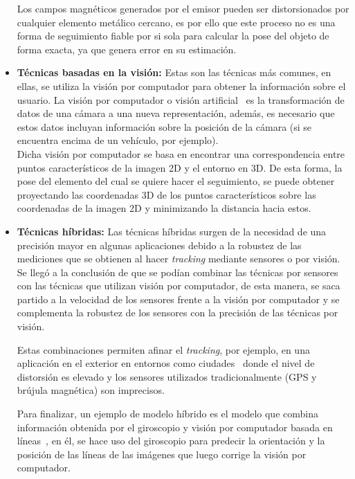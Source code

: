 \begin{itemize}
    Los campos magnéticos generados por el emisor pueden ser distorsionados por cualquier elemento metálico cercano, es por ello que este proceso no es una forma de seguimiento fiable por si sola para calcular la pose del objeto de forma exacta, ya que genera error en su estimación.\\
    

    \item \textbf{Técnicas basadas en la visión:} Estas son las técnicas más comunes, en ellas, se utiliza la visión por computador para obtener la información sobre el usuario. La visión por computador o visión artificial~\cite{visionporcomputador} es la transformación de datos de una cámara a una nueva representación, además, es necesario que estos datos incluyan información sobre la posición de la cámara (si se encuentra encima de un vehículo, por ejemplo).\\
    
    Dicha visión por computador se basa en encontrar una correspondencia entre puntos característicos de la imagen 2D y el entorno en 3D. De esta forma, la pose del elemento del cual se quiere hacer el seguimiento, se puede obtener proyectando las coordenadas 3D de los puntos característicos sobre las coordenadas de la imagen 2D y minimizando la distancia hacia estos.
    
    \item \textbf{Técnicas híbridas:} Las técnicas híbridas surgen de la necesidad de una precisión mayor en algunas aplicaciones debido a la robustez de las mediciones que se obtienen al hacer \textit{tracking} mediante sensores o por visión. Se llegó a la conclusión de que se podían combinar las técnicas por sensores con las técnicas que utilizan visión por computador, de esta manera, se saca partido a la velocidad de los sensores frente a la visión por computador y se complementa la robustez de los sensores con la precisión de las técnicas por visión. 
    
    Estas combinaciones permiten afinar el \textit{tracking}, por ejemplo, en una aplicación en el exterior en entornos como ciudades~\cite{hybridtrackingUrban} donde el nivel de distorsión es elevado y los sensores utilizados tradicionalmente (GPS y brújula magnética) son imprecisos.
    
    Para finalizar, un ejemplo de modelo híbrido es el modelo que combina información obtenida por el giroscopio y visión por computador basada en líneas~\cite{robustHybridmodel}, en él, se hace uso del giroscopio para predecir la orientación y la posición de las líneas de las imágenes que luego corrige la visión por computador.
    
\end{itemize}

